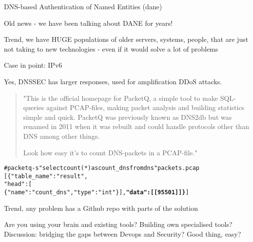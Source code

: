 \documentclass[20pt,landscape,a4paper,footrule]{foils}
\begin{document}
DNS-based Authentication of Named Entities (dane)

Old news - we have been talking about DANE for years!
\\
{\footnotesize {}}

Trend, we have HUGE populations of older servers, systems, people,
that are just not taking to new technologies - even if it would solve a lot of problems

Case in point: IPv6


Yes, DNSSEC has larger responses, used for amplification DDoS attacks.

\begin{quote}
"This is the official homepage for PacketQ, a simple tool to make SQL-queries against PCAP-files, making packet analysis and building statistics simple and quick. PacketQ was previously known as DNS2db but was renamed in 2011 when it was rebuilt and could handle protocols other than DNS among other things.

Look how easy it's to count DNS-packets in a PCAP-file."
\end{quote}

\begin{alltt}
\small
# packetq -s "select count(*) as count_dns from dns" packets.pcap
[ \{ "table_name": "result",
      "head": [
      \{ "name": "count_dns","type": "int" \} ],   {\bf "data": [ [95501] ] \}} ]
\end{alltt}


Trend, any problem has a Github repo with parts of the solution \smiley



Are you using your brain and existing tools? Building own specialised tools?\\
Discussion: bridging the gaps between Devops and Security? Good thing, easy?

{\footnotesize
{}\\
}

\end{document}
